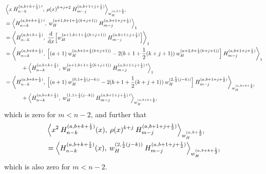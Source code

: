 \documentclass[11pt, oneside]{article}   	%
\newcommand{\half}{\frac{1}{2}}
\newcommand{\ddx}{\frac{\mathrm{d}}{\mathrm{d}x}}
\newcommand{\pddx}{\frac{\partial}{\partial x}}
\newcommand{\Pnkab}{P_{n,k}^{(a,b)}}
\begin{document}
\begin{align*}
	&\ip< x \: H_{n-k}^{(a, b+k+\half) \: \prime}, \: \rho(x)^{k+j+2} \: H_{m-j}^{(a, b+1+j+\half)} >_{w_H^{(a, b+\half)}}  \\
	&= \ip<H_{n-k}^{(a, b+k+\half) \: \prime}, \: w_H^{(a+1, b+1+\half(k+j+1))} \: H_{m-j}^{(a, b+1+j+\half)} >_1 \\
	&= \ip<H_{n-k}^{(a, b+k+\half)}, \: \ddx \Big[w_H^{(a+1, b+1+\half(k+j+1))} \: H_{m-j}^{(a, b+1+j+\half)} \Big] >_1 \\
	&= \ip<H_{n-k}^{(a, b+k+\half)}, \: \Big[(a+1) \: w_H^{(a, b+1+\half(k+j+1))} -2(b+1+\half(k+j+1)) \: w_H^{(a+2, b+\half(k+j+1))} \Big] \: H_{m-j}^{(a, b+1+j+\half)} >_1 \\
		&\quad \quad \quad + \ip<H_{n-k}^{(a, b+k+\half)}, \: w_H^{(a+1, b+1+\half(k+j+1))} \: H_{m-j}^{(a, b+1+j+\half) \: \prime}>_1 \\
	&= \ip<H_{n-k}^{(a, b+k+\half)}, \: \Big[(a+1) \: w_H^{(0,1+\half(j-k))} -2(b+1+\half(k+j+1)) \: w_H^{(2, \half(j-k))} \Big] \: H_{m-j}^{(a, b+1+j+\half)} >_{w_H^{(a, b+k+\half)}} \\
		&\quad \quad \quad + \ip<H_{n-k}^{(a, b+k+\half)}, \: w_H^{(1, 1+\half(j-k))} \: H_{m-j}^{(a, b+1+j+\half) \: \prime}>_{w_H^{(a, b+k+\half)}}
\end{align*}
which is zero for $m < n - 2$, and further that
\begin{align*}
	&\ip< x^2 \: H_{n-k}^{(a, b+k+\half)}(x), \: \rho(x)^{k+j} \: H_{m-j}^{(a, b+1+j+\half)} >_{w_H^{(a, b+\half)}} \\
	&= \ip< H_{n-k}^{(a, b+k+\half)}(x), \: w_H^{(2, \half(j-k))} \: H_{m-j}^{(a, b+1+j+\half)} >_{w_H^{(a, b+k+\half)}}
\end{align*}
which is also zero for $m < n - 2$.
\end{document}
